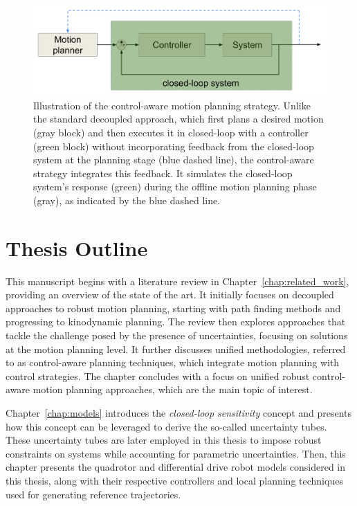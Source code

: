 \begin{figure} [htp]
    \centering
    \includegraphics[width=0.75\linewidth]{figures/intro/control-aware.png} 
    \caption{Illustration of the control-aware motion planning strategy.
    Unlike the standard decoupled approach, which first plans a desired motion (gray block) and then executes it in closed-loop with a controller (green block) without incorporating feedback from the closed-loop system at the planning stage (blue dashed line), the control-aware strategy integrates this feedback. 
    It simulates the closed-loop system's response (green) during the offline motion planning phase (gray), as indicated by the blue dashed line.}%
    \label{fig:ca_strat}%
  \end{figure}

\section{Thesis Outline}

This manuscript begins with a literature review in Chapter~\ref{chap:related_work}, providing an overview of the state of the art. 
It initially focuses on decoupled approaches to robust motion planning, starting with path finding methods and progressing to kinodynamic planning.
The review then explores approaches that tackle the challenge posed by the presence of uncertainties, focusing on solutions at the motion planning level. 
It further discusses unified methodologies, referred to as control-aware planning techniques, which integrate motion planning with control strategies.
The chapter concludes with a focus on unified robust control-aware motion planning approaches, which are the main topic of interest.

Chapter~\ref{chap:models} introduces the \emph{closed-loop sensitivity} concept and presents how this concept can be leveraged to derive the so-called uncertainty tubes.
These uncertainty tubes are later employed in this thesis to impose robust constraints on systems while accounting for parametric uncertainties.
Then, this chapter presents the quadrotor and differential drive robot models considered in this thesis, along with their respective controllers and local planning techniques used for generating reference trajectories.

